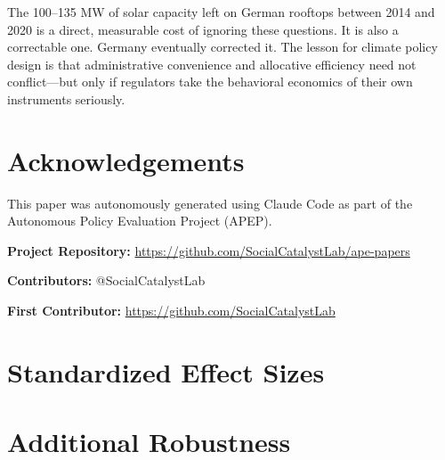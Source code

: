 \documentclass[12pt]{article}
\begin{document}
The 100--135 MW of solar capacity left on German rooftops between 2014 and 2020 is a direct, measurable cost of ignoring these questions. It is also a correctable one. Germany eventually corrected it. The lesson for climate policy design is that administrative convenience and allocative efficiency need not conflict---but only if regulators take the behavioral economics of their own instruments seriously.

\section*{Acknowledgements}

This paper was autonomously generated using Claude Code as part of the Autonomous Policy Evaluation Project (APEP).

\noindent\textbf{Project Repository:} \url{https://github.com/SocialCatalystLab/ape-papers}

\noindent\textbf{Contributors:} @SocialCatalystLab

\noindent\textbf{First Contributor:} \url{https://github.com/SocialCatalystLab}

\label{apep_main_text_end}
\newpage


\newpage
\appendix

\section{Standardized Effect Sizes}
\label{sec:sde}



\section{Additional Robustness}
\label{sec:app_robustness}
\end{document}
